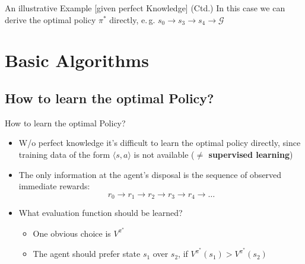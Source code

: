 \begin{frame}{An illustrative Example [given perfect Knowledge] (Ctd.)}{}
	In this case we can derive the optimal policy $\pi^*$ directly,
		e.\,g. $s_0 \rightarrow s_3 \rightarrow s_4 \rightarrow \mathcal{G}$
\end{frame}


\section{Basic Algorithms}

\subsection{How to learn the optimal Policy?}

\begin{frame}{How to learn the optimal Policy?}{}
	\begin{itemize}
		\item W/o perfect knowledge it's difficult to learn the optimal policy directly, since training data of the
			form $\langle s, a \rangle$ is not available (\textbf{$\ne$ supervised learning})
		\item The only information at the agent's disposal is the sequence of observed immediate rewards: 
		\begin{equation*}
			r_0 \longrightarrow r_1 \longrightarrow r_2 \longrightarrow r_3 \longrightarrow r_4 \longrightarrow \dots
		\end{equation*}
		\item What evaluation function should be learned?
		\begin{itemize}
			\item One obvious choice is $V^{\pi^*}$
			\item The agent should prefer state $s_1$ over $s_2$, if $V^{\pi^*}(s_1) > V^{\pi^*}(s_2)$
		\end{itemize}
	\end{itemize}
\end{frame}



